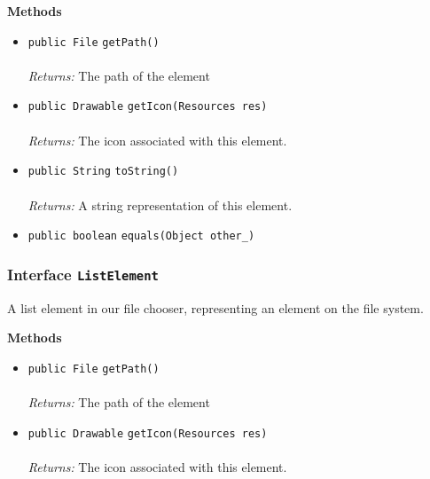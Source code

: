 \textbf{\sffamily Methods}
\begin{itemize}
\item \lstinline|public File| \lstinline|getPath|\lstinline|()|\\ \\[-0.6em]
\emph{Returns:} The path of the element



\item \lstinline|public Drawable| \lstinline|getIcon|\lstinline|(Resources res)|\\ \\[-0.6em]
\emph{Returns:} The icon associated with this element.



\item \lstinline|public String| \lstinline|toString|\lstinline|()|\\ \\[-0.6em]
\emph{Returns:} A string representation of this element.



\item \lstinline|public boolean| \lstinline|equals|\lstinline|(Object other_)| \\[-0.6em]




\end{itemize}

\subsubsection{Interface \lstinline|ListElement|}
A list element in our file chooser, representing an element on the file system. \\
\noindent\begin{minipage}[t]{5cm}
\vspace{0.3em}
\hspace*{2em}
\vspace{0.3em}
\end{minipage}





\textbf{\sffamily Methods}
\begin{itemize}
\item \lstinline|public File| \lstinline|getPath|\lstinline|()|\\ \\[-0.6em]
\emph{Returns:} The path of the element



\item \lstinline|public Drawable| \lstinline|getIcon|\lstinline|(Resources res)|\\ \\[-0.6em]
\emph{Returns:} The icon associated with this element.



\end{itemize}


